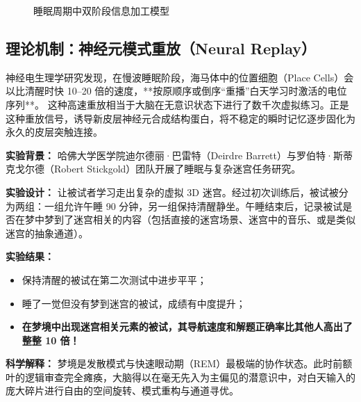 \documentclass[12pt,a4paper,openany]{ctexbook}
\begin{document}
\begin{figure}[H]
\centering
{}
\caption{睡眠周期中双阶段信息加工模型}
\end{figure}

\subsection*{理论机制：神经元模式重放（Neural Replay）}

神经电生理学研究发现，在慢波睡眠阶段，海马体中的位置细胞（Place Cells）会以比清醒时快 10--20 倍的速度，**按原顺序或倒序“重播”白天学习时激活的电位序列**。
这种高速重放相当于大脑在无意识状态下进行了数千次虚拟练习。正是这种重放信号，诱导新皮层神经元合成结构蛋白，将不稳定的瞬时记忆逐步固化为永久的皮层突触连接。

\begin{casebox}[梦境与复杂解题的认知实验]
\textbf{实验背景：} 哈佛大学医学院迪尔德丽·巴雷特（Deirdre Barrett）与罗伯特·斯蒂克戈尔德（Robert Stickgold）团队开展了睡眠与复杂迷宫任务研究。

\textbf{实验设计：} 
让被试者学习走出复杂的虚拟 3D 迷宫。经过初次训练后，被试被分为两组：一组允许午睡 90 分钟，另一组保持清醒静坐。午睡结束后，记录被试是否在梦中梦到了迷宫相关的内容（包括直接的迷宫场景、迷宫中的音乐、或是类似迷宫的抽象通道）。

\textbf{实验结果：}
\begin{itemize}
    \item 保持清醒的被试在第二次测试中进步平平；
    \item 睡了一觉但没有梦到迷宫的被试，成绩有中度提升；
    \item \textbf{在梦境中出现迷宫相关元素的被试，其导航速度和解题正确率比其他人高出了整整 10 倍！}
\end{itemize}

\textbf{科学解释：}
梦境是发散模式与快速眼动期（REM）最极端的协作状态。此时前额叶的逻辑审查完全瘫痪，大脑得以在毫无先入为主偏见的潜意识中，对白天输入的庞大碎片进行自由的空间旋转、模式重构与通道寻优。
\end{casebox}
\end{document}
